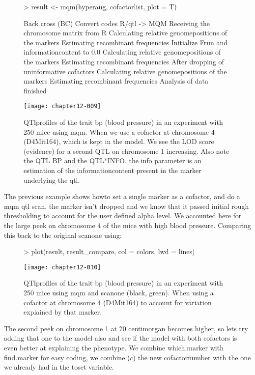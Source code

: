 \documentclass[11pt]{article}
\begin{document}
\begin{figure}[ht]
\begin{Schunk}
\begin{Sinput}
> result <- mqm(hyperaug, cofactorlist, plot = T)
\end{Sinput}
\begin{Soutput}
Back cross (BC)
Convert codes R/qtl -> MQM
Receiving the chromosome matrix from R
Calculating relative genomepositions of the markers
Estimating recombinant frequencies
Initialize Frun and informationcontent to 0.0
Calculating relative genomepositions of the markers
Estimating recombinant frequencies
After dropping of uninformative cofactors
Calculating relative genomepositions of the markers
Estimating recombinant frequencies
Analysis of data finished
\end{Soutput}
\end{Schunk}
\texttt{[image: chapter12-009]}
\\
\caption{QTlprofiles of the trait bp (blood pressure) in an experiment with 250 mice using mqm. When we use a cofactor at chromosome 4 (D4Mit164), which is kept in the model. We see the LOD score (evidence) for a second QTL on chromosome 1 increasing. Also note the QTL BP and the QTL*INFO. the info parameter is an estimation of the informationcontent present in the marker underlying the qtl.}
\end{figure}
The previous example shows howto set a single marker as a cofactor, and do a mqm qtl scan, the marker isn't dropped and we know that it passed initial rough thresholding to account for the user defined alpha level. We accounted here for the large peek on chromosome 4 of the mice with high blood pressure. Comparing this back to the original scanone using:
\begin{figure}[ht]
\begin{Schunk}
\begin{Sinput}
> plot(result, result_compare, col = colors, lwd = lines)
\end{Sinput}
\end{Schunk}
\texttt{[image: chapter12-010]}
\caption{QTlprofiles of the trait bp (blood pressure) in an experiment with 250 mice using mqm and scanone (black, green). When using a cofactor at chromosome 4 (D4Mit164) to account for variation explained by that marker.}
\end{figure}
The second peek on chromosome 1 at \~70 centimorgan becomes higher, so lets try adding that one to the model also and see if the model with both cofactors is even better at explaining the phenotype. We combine which.marker with find.marker for easy coding, we combine ($c$) the new cofactornumber with the one we already had in the toset variable.
\end{document}
